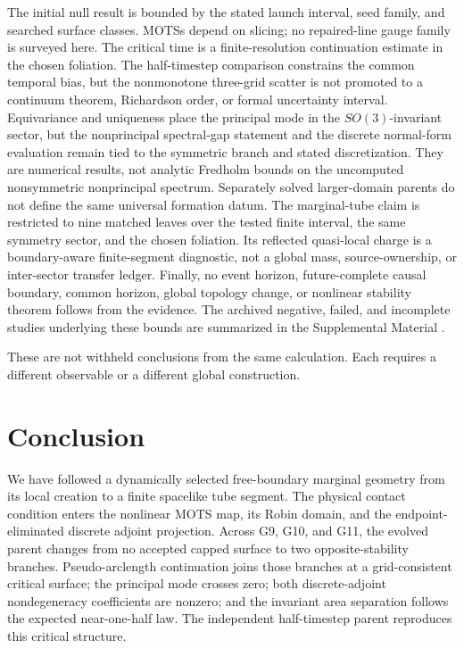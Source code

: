 \documentclass[11pt]{article}
\begin{document}
The initial null result is bounded by the stated launch interval, seed family,
and searched surface classes.  MOTSs depend on slicing; no repaired-line gauge
family is surveyed here.  The critical time is a finite-resolution
continuation estimate in the chosen foliation.  The half-timestep comparison
constrains the common temporal bias, but the nonmonotone three-grid scatter is
not promoted to a continuum theorem, Richardson order, or formal uncertainty
interval.  Equivariance and uniqueness place the principal mode in the
$SO(3)$-invariant sector, but the nonprincipal spectral-gap statement and the
discrete normal-form evaluation remain tied to the symmetric branch and stated
discretization.  They are numerical results, not analytic Fredholm bounds on
the uncomputed nonsymmetric nonprincipal spectrum.  Separately solved
larger-domain parents do not define the same universal formation datum.
The marginal-tube claim is restricted to nine matched leaves over the tested
finite interval, the same symmetry sector, and the chosen foliation.  Its
reflected quasi-local charge is a boundary-aware finite-segment diagnostic,
not a global mass, source-ownership, or inter-sector transfer ledger.
Finally, no event horizon, future-complete causal boundary, common horizon,
global topology change, or nonlinear stability theorem follows from the evidence.
The archived negative, failed, and incomplete studies underlying these bounds
are summarized in the Supplemental Material \cite{SupplementalMaterial}.

These are not withheld conclusions from the same calculation.  Each requires
a different observable or a different global construction.

\section{Conclusion}

We have followed a dynamically selected free-boundary marginal geometry from
its local creation to a finite spacelike tube segment.  The physical contact
condition enters the nonlinear MOTS map, its Robin domain, and the
endpoint-eliminated discrete adjoint projection.  Across G9, G10, and G11,
the evolved parent changes from no accepted capped surface to two
opposite-stability branches.  Pseudo-arclength continuation joins those
branches at a grid-consistent critical surface; the principal mode crosses
zero; both discrete-adjoint nondegeneracy coefficients are nonzero; and the
invariant area separation follows the expected near-one-half law.  The
independent half-timestep parent reproduces this critical structure.
\end{document}
